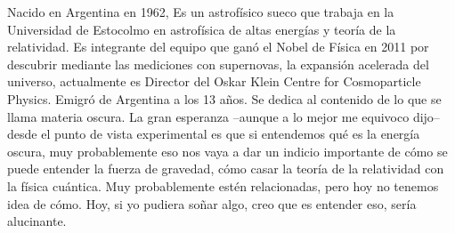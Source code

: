 



























\begin{parchment}{Nacido en Argentina en 1962, Es un astrofísico sueco que trabaja en la Universidad de Estocolmo en astrofísica de altas energías y teoría de la relatividad. Es integrante del equipo que ganó el Nobel de Física en 2011 por descubrir mediante las mediciones con supernovas, la expansión acelerada del universo, actualmente es Director del Oskar Klein Centre for Cosmoparticle Physics. Emigró de Argentina a los 13 años. Se dedica al contenido de lo que se llama materia oscura.
La gran esperanza –aunque a lo mejor me equivoco dijo– desde el punto de vista experimental es que si entendemos qué es la energía oscura, muy probablemente eso nos vaya a dar un indicio importante de cómo se puede entender la fuerza de gravedad, cómo casar la teoría de la relatividad con la física cuántica. Muy probablemente estén relacionadas, pero hoy no tenemos idea de cómo. Hoy, si yo pudiera soñar algo, creo que es entender eso, sería alucinante. \cite{goobar}}
\end{parchment}















\bigskip


\newpage



